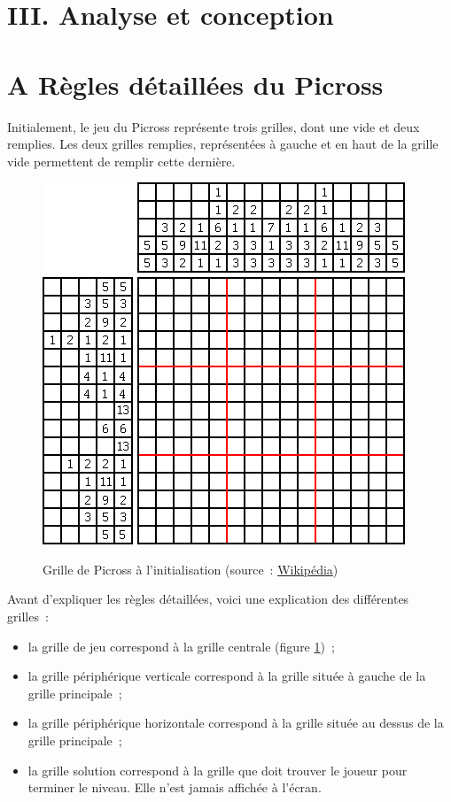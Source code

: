 \documentclass[a4paper,11pt]{article}
\begin{document}
\section*{\LARGE III. Analyse et conception}
\label{section*:analyse_conception}
\section*{A \hspace*{0.3cm} Règles détaillées du Picross}
\label{section:regles_detailless_picross}
Initialement, le jeu du Picross représente trois grilles, dont une vide et deux remplies. Les deux grilles remplies, représentées à gauche et en haut de la grille vide permettent de remplir cette dernière.
\begin{figure}[!h]
	\centering
	\caption[Grille de Picross à l'initialisation]{Grille de Picross à l'initialisation (source~: \href{https://commons.wikimedia.org/wiki/File:Paint_by_Number_Example.png}{Wikipédia})}\medbreak
	\includegraphics[scale=0.5]{PaintbyNumberExample.png}
	\label{figure:grille_initialisation}
\end{figure}\bigbreak
Avant d’expliquer les règles détaillées, voici une explication des différentes grilles~:\medbreak
\begin{itemize}[label=$\square$]
	\item la grille de jeu correspond à la grille centrale (figure \ref{figure:grille_initialisation})~;
	\item la grille périphérique verticale correspond à la grille située à gauche de la grille principale~;
	\item la grille périphérique horizontale correspond à la grille située au dessus de la grille principale~;
	\item la grille solution correspond à la grille que doit trouver le joueur pour terminer le niveau. Elle n'est jamais affichée à l'écran.
\end{itemize}\bigbreak
\end{document}
